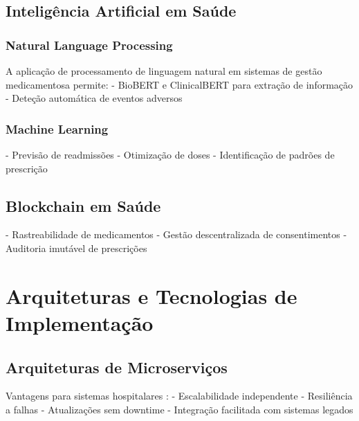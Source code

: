 
\subsection{Inteligência Artificial em Saúde}

\subsubsection{Natural Language Processing}

A aplicação de processamento de linguagem natural \cite{rozenblum2020} em sistemas de gestão medicamentosa permite:
- BioBERT e ClinicalBERT para extração de informação %
- Deteção automática de eventos adversos %

\subsubsection{Machine Learning}
- Previsão de readmissões
- Otimização de doses
- Identificação de padrões de prescrição


\subsection{Blockchain em Saúde}
- Rastreabilidade de medicamentos \cite{franzoso2014}
- Gestão descentralizada de consentimentos
- Auditoria imutável de prescrições

\section{Arquiteturas e Tecnologias de Implementação}

\subsection{Arquiteturas de Microserviços}


Vantagens para sistemas hospitalares \cite{shermock2023,vaghasiya2023}:
- Escalabilidade independente
- Resiliência a falhas
- Atualizações sem downtime \cite{greenhalgh2017}
- Integração facilitada com sistemas legados \cite{newman2021}


